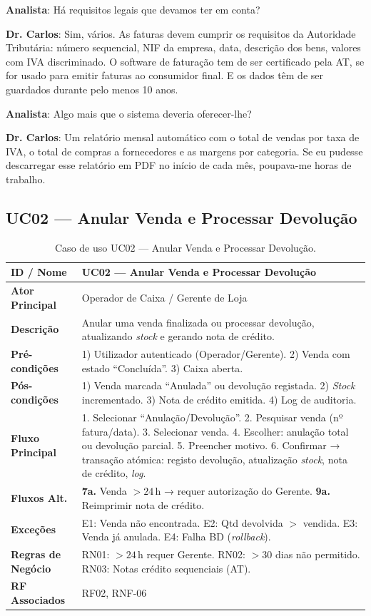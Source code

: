 \documentclass[a4paper,12pt]{scrreprt}
\begin{document}
\textbf{Analista}: Há requisitos legais que devamos ter em conta?

\textbf{Dr. Carlos}: Sim, vários. As faturas devem cumprir os requisitos da Autoridade Tributária: número sequencial, NIF da empresa, data, descrição dos bens, valores com IVA discriminado. O software de faturação tem de ser certificado pela AT, se for usado para emitir faturas ao consumidor final. E os dados têm de ser guardados durante pelo menos 10 anos.

\textbf{Analista}: Algo mais que o sistema deveria oferecer-lhe?

\textbf{Dr. Carlos}: Um relatório mensal automático com o total de vendas por taxa de IVA, o total de compras a fornecedores e as margens por categoria. Se eu pudesse descarregar esse relatório em PDF no início de cada mês, poupava-me horas de trabalho.



\subsection*{UC02 --- Anular Venda e Processar Devolução}
\begin{table}[H]
\centering\small
\begin{tabular}{|p{3cm}|p{11cm}|}
\hline
\textbf{ID / Nome} & UC02 --- Anular Venda e Processar Devolução \\
\hline
\textbf{Ator Principal} & Operador de Caixa / Gerente de Loja \\
\hline
\textbf{Descrição} & Anular uma venda finalizada ou processar devolução, atualizando \textit{stock} e gerando nota de crédito. \\
\hline
\textbf{Pré-condições} & 1) Utilizador autenticado (Operador/Gerente). 2) Venda com estado ``Concluída''. 3) Caixa aberta. \\
\hline
\textbf{Pós-condições} & 1) Venda marcada ``Anulada'' ou devolução registada. 2) \textit{Stock} incrementado. 3) Nota de crédito emitida. 4) Log de auditoria. \\
\hline
\textbf{Fluxo Principal} & 1. Selecionar ``Anulação/Devolução''. 2. Pesquisar venda (nº fatura/data). 3. Selecionar venda. 4. Escolher: anulação total ou devolução parcial. 5. Preencher motivo. 6. Confirmar → transação atómica: registo devolução, atualização \textit{stock}, nota de crédito, \textit{log}. \\
\hline
\textbf{Fluxos Alt.} & \textbf{7a.} Venda $> 24$\,h → requer autorização do Gerente. \textbf{9a.} Reimprimir nota de crédito. \\
\hline
\textbf{Exceções} & E1: Venda não encontrada. E2: Qtd devolvida $>$ vendida. E3: Venda já anulada. E4: Falha BD (\textit{rollback}). \\
\hline
\textbf{Regras de Negócio} & RN01: $> 24$\,h requer Gerente. RN02: $> 30$ dias não permitido. RN03: Notas crédito sequenciais (AT). \\
\hline
\textbf{RF Associados} & RF02, RNF-06 \\
\hline
\end{tabular}
\caption{Caso de uso UC02 --- Anular Venda e Processar Devolução.}
\end{table}
\end{document}
